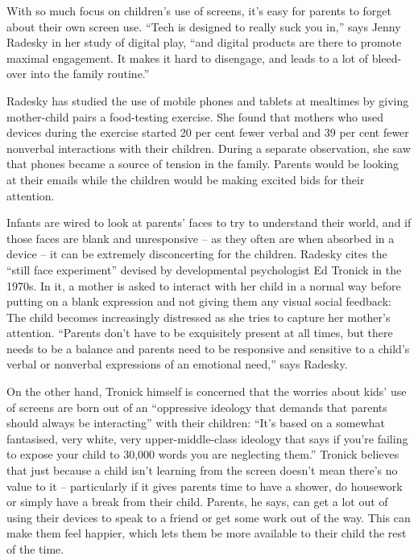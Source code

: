 With so much focus on children's use of screens, it's easy for parents to forget about their own screen use. ``Tech is designed to really suck you in,'' says Jenny Radesky in her study of digital play, ``and digital products are there to promote maximal engagement. It makes it hard to disengage, and leads to a lot of bleed-over into the family routine.''


Radesky has studied the use of mobile phones and tablets at mealtimes by giving mother-child pairs a food-testing exercise. She found that mothers who used devices during the exercise started 20 per cent fewer verbal and 39 per cent fewer nonverbal interactions with their children. During a separate observation, she saw that phones became a source of tension in the family. Parents would be looking at their emails while the children would be making excited bids for their attention.


Infants are wired to look at parents' faces to try to understand their world, and if those faces are blank and unresponsive – as they often are when absorbed in a device – it can be extremely disconcerting for the children. Radesky cites the ``still face experiment'' devised by developmental psychologist Ed Tronick in the 1970s. In it, a mother is asked to interact with her child in a normal way before putting on a blank expression and not giving them any visual social feedback: The child becomes increasingly distressed as she tries to capture her mother's attention. ``Parents don't have to be exquisitely present at all times, but there needs to be a balance and parents need to be responsive and sensitive to a child's verbal or nonverbal expressions of an emotional need,'' says Radesky.


On the other hand, Tronick himself is concerned that the worries about kids' use of screens are born out of an ``oppressive ideology that demands that parents should always be interacting'' with their children: ``It's based on a somewhat fantasised, very white, very upper-middle-class ideology that says if you're failing to expose your child to 30,000 words you are neglecting them.'' Tronick believes that just because a child isn't learning from the screen doesn't mean there's no value to it – particularly if it gives parents time to have a shower, do housework or simply have a break from their child. Parents, he says, can get a lot out of using their devices to speak to a friend or get some work out of the way. This can make them feel happier, which lets them be more available to their child the rest of the time.


